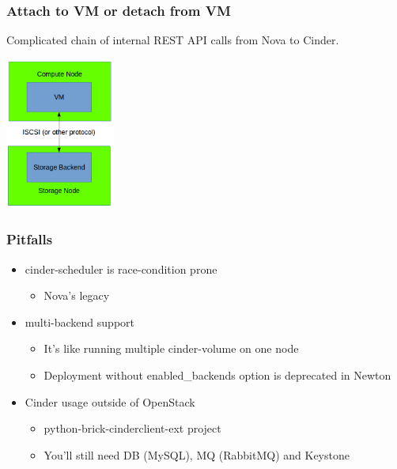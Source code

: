 \documentclass[aspectratio=169]{beamer}
\begin{document}
\begin{frame}
    \frametitle{Attach to VM or detach from VM}
    Complicated chain of internal REST API calls from Nova to Cinder.
    \pause
    \begin{center}
        \includegraphics[height=5cm]{images/attached.png}
    \end{center}
\end{frame}

\begin{frame}
    \frametitle{Pitfalls}
    \begin{itemize}
        \pause
        \item cinder-scheduler is race-condition prone
        \begin{itemize}
            \item Nova's legacy
        \end{itemize}
        \pause
        \item multi-backend support
        \begin{itemize}
            \item It's like running multiple cinder-volume on one node
            \item Deployment without enabled\_backends option is deprecated in Newton
        \end{itemize}
        \pause
        \item Cinder usage outside of OpenStack
        \begin{itemize}
            \item python-brick-cinderclient-ext project 
            \item You'll still need DB (MySQL), MQ (RabbitMQ) and Keystone
        \end{itemize}
    \end{itemize}
\end{frame}
\end{document}
